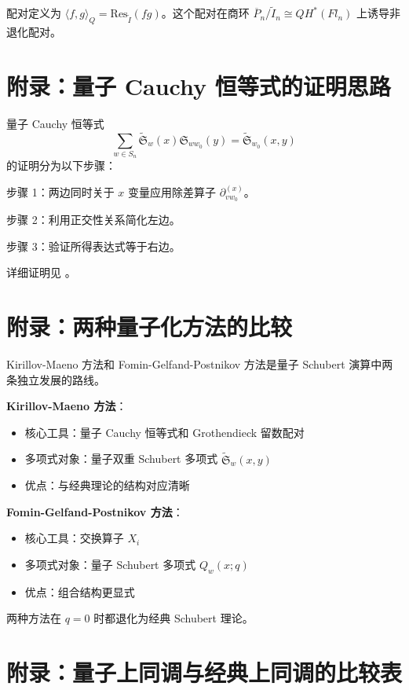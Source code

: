 配对定义为 $\langle f, g \rangle_Q = \mathrm{Res}_{\widetilde{I}}(fg)$。这个配对在商环 $\overline{P}_n / \widetilde{I}_n \cong QH^*(Fl_n)$ 上诱导非退化配对。

\section{附录：量子 Cauchy 恒等式的证明思路}
\label{sec:cauchy-proof-sketch}

量子 Cauchy 恒等式
$$\sum_{w \in S_n} \widetilde{\mathfrak{S}}_w(x) \mathfrak{S}_{ww_0}(y) = \widetilde{\mathfrak{S}}_{w_0}(x,y)$$
的证明分为以下步骤：

步骤 1：两边同时关于 $x$ 变量应用除差算子 $\partial_{vw_0}^{(x)}$。

步骤 2：利用正交性关系简化左边。

步骤 3：验证所得表达式等于右边。

详细证明见 \cite[ Theorem B]{KM}。

\section{附录：两种量子化方法的比较}
\label{sec:KM-vs-FGP}

Kirillov-Maeno 方法和 Fomin-Gelfand-Postnikov 方法是量子 Schubert 演算中两条独立发展的路线。

\textbf{Kirillov-Maeno 方法}：
\begin{itemize}
\item 核心工具：量子 Cauchy 恒等式和 Grothendieck 留数配对
\item 多项式对象：量子双重 Schubert 多项式 $\widetilde{\mathfrak{S}}_w(x,y)$
\item 优点：与经典理论的结构对应清晰
\end{itemize}

\textbf{Fomin-Gelfand-Postnikov 方法}：
\begin{itemize}
\item 核心工具：交换算子 $X_i$
\item 多项式对象：量子 Schubert 多项式 $Q_w(x;q)$
\item 优点：组合结构更显式
\end{itemize}

两种方法在 $q=0$ 时都退化为经典 Schubert 理论。

\section{附录：量子上同调与经典上同调的比较表}
\label{sec:quantum-vs-classical-table}

